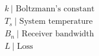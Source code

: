 \documentclass[preview]{standalone}
\begin{document}
\begin{align*}
&k\  \text{| Boltzmann's constant} \\ &T_s\  \text{| System temperature} \\ &B_n\  \text{| Receiver bandwidth} \\ &L\  \text{| Loss}
\end{align*}
\end{document}
